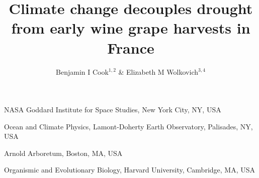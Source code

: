\documentclass[final]{nature}
\title{Climate change decouples drought from early wine grape harvests in France}
\author{Benjamin I Cook$^{1,2}$ \& Elizabeth M Wolkovich$^{3,4}$}
\begin{document}
\maketitle

\begin{affiliations}
 \item NASA Goddard Institute for Space Studies, New York City, NY, USA
 \item Ocean and Climate Physics, Lamont-Doherty Earth Observatory, Palisades, NY, USA
 \item Arnold Arboretum, Boston, MA, USA
 \item Organismic and Evolutionary Biology, Harvard University, Cambridge, MA, USA
\end{affiliations}

\begin{abstract}

\end{abstract}
\end{document}
